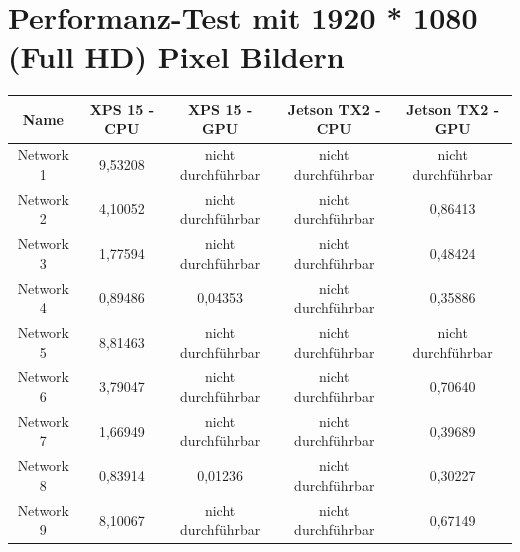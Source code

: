 \section{Performanz-Test mit 1920 * 1080 (Full HD) Pixel Bildern}
\begin{table}[H]
    \centering
    \begin{tabular}{ |c|c|c|c|c| }
        \hline
        \textbf{Name} & \textbf{XPS 15 - CPU} & \textbf{XPS 15 - GPU} & \textbf{Jetson TX2 - CPU} & \textbf{Jetson TX2 - GPU}   \\ \hline
        Network  1 & 9,53208                                & \textcolor{danger}{nicht durchführbar} & \textcolor{danger}{nicht durchführbar} & \textcolor{danger}{nicht durchführbar} \\ \hline
        Network  2 & 4,10052                                & \textcolor{danger}{nicht durchführbar} & \textcolor{danger}{nicht durchführbar} & 0,86413                                \\ \hline
        Network  3 & 1,77594                                & \textcolor{danger}{nicht durchführbar} & \textcolor{danger}{nicht durchführbar} & 0,48424                                \\ \hline
        Network  4 & 0,89486                                & 0,04353                                & \textcolor{danger}{nicht durchführbar} & 0,35886                                \\ \hline
        Network  5 & 8,81463                                & \textcolor{danger}{nicht durchführbar} & \textcolor{danger}{nicht durchführbar} & \textcolor{danger}{nicht durchführbar} \\ \hline
        Network  6 & 3,79047                                & \textcolor{danger}{nicht durchführbar} & \textcolor{danger}{nicht durchführbar} & 0,70640                                \\ \hline
        Network  7 & 1,66949                                & \textcolor{danger}{nicht durchführbar} & \textcolor{danger}{nicht durchführbar} & 0,39689                                \\ \hline
        Network  8 & 0,83914                                & 0,01236                                & \textcolor{danger}{nicht durchführbar} & 0,30227                                \\ \hline
        Network  9 & 8,10067                                & \textcolor{danger}{nicht durchführbar} & \textcolor{danger}{nicht durchführbar} & 0,67149                                \\ \hline

\end{tabular}
\end{table}
